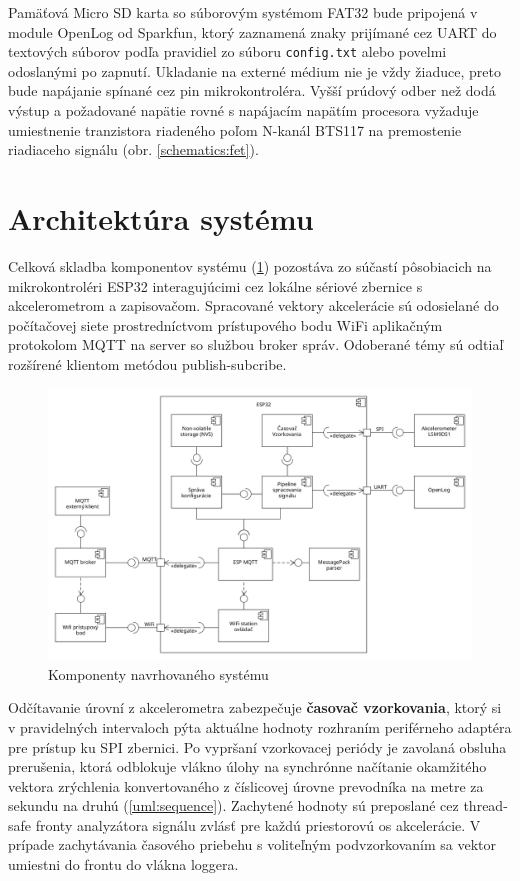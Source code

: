 Pamäťová Micro SD karta so súborovým systémom FAT32 bude pripojená v module OpenLog od Sparkfun, ktorý zaznamená znaky
prijímané cez UART do textových súborov podľa pravidiel zo súboru \verb|config.txt| alebo povelmi odoslanými
po zapnutí. Ukladanie na externé médium nie je vždy žiaduce, preto bude napájanie spínané cez pin mikrokontroléra. Vyšší
prúdový odber než dodá výstup a požadované napätie rovné s napájacím napätím procesora vyžaduje umiestnenie tranzistora riadeného
poľom N-kanál BTS117 na premostenie riadiaceho signálu (obr. \ref{schematics:fet}).


\section{Architektúra systému}
Celková skladba komponentov systému (\ref{uml:component}) pozostáva zo súčastí pôsobiacich na mikrokontroléri ESP32
interagujúcimi cez lokálne sériové zbernice s akcelerometrom a zapisovačom. Spracované vektory akcelerácie sú
odosielané do počítačovej siete prostredníctvom prístupového bodu WiFi aplikačným protokolom MQTT
na server so službou broker správ. Odoberané témy sú odtiaľ rozšírené klientom metódou publish-subcribe.
\begin{figure}[h]
	\centering
	\includegraphics[width=\textwidth]{figures/design/components.png}
	\caption{Komponenty navrhovaného systému}
	\label{uml:component}
\end{figure}

Odčítavanie úrovní z akcelerometra zabezpečuje \textbf{časovač vzorkovania}, ktorý si v pravidelných intervaloch pýta aktuálne
hodnoty rozhraním periférneho adaptéra pre prístup ku SPI zbernici. Po vypršaní vzorkovacej periódy je zavolaná obsluha prerušenia, ktorá
odblokuje vlákno úlohy na synchrónne načítanie okamžitého vektora zrýchlenia konvertovaného z číslicovej úrovne prevodníka na metre za
sekundu na druhú (\ref{uml:sequence}). Zachytené hodnoty sú preposlané cez thread-safe fronty analyzátora signálu zvlásť pre každú
priestorovú os akcelerácie. V prípade zachytávania časového priebehu s voliteľným podvzorkovaním sa vektor umiestni do frontu do
vlákna loggera.


